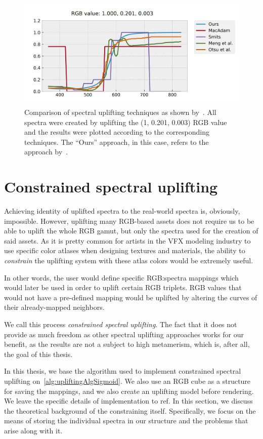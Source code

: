 \begin{figure}[t!]
	\centering
	\includegraphics[width=0.8\linewidth]{img/upsampling_techniques.png}
	\caption{Comparison of spectral uplifting techniques as shown by~\citet{upsamplingJakobHanika}. All spectra were created by uplifting the (1, 0.201, 0.003) RGB value and the results were plotted according to the corresponding techniques. The ``Ours'' approach, in this case, refers to the approach by~\citet{upsamplingJakobHanika}.}
	\label{fig:upliftingTechniques}
\end{figure}

\section{Constrained spectral uplifting}

Achieving identity of uplifted spectra to the real-world spectra is, obviously, impossible. However, uplifting many RGB-based assets does not require us to be able to uplift the whole RGB gamut, but only the spectra used for the creation of said assets. As it is pretty common for artists in the VFX modeling industry to use specific color atlases when designing textures and materials, the ability to \emph{constrain} the uplifting system with these atlas colors would be extremely useful.

In other words, the user would define specific RGB:spectra mappings which would later be used in order to uplift certain RGB triplets. RGB values that would not have a pre-defined mapping would be uplifted by altering the curves of their already-mapped neighbors. 

We call this process \emph{constrained spectral uplifting}. The fact that it does not provide as much freedom as other spectral uplifting approaches works for our benefit, as the results are not a subject to high metamerism, which is, after all, the goal of this thesis.

In this thesis, we base the algorithm used to implement constrained spectral uplifting on~\cref{alg:upliftingAlgSigmoid}. We also use an RGB cube as a structure for saving the mappings, and we also create an uplifting model before rendering. We leave the specific details of implementation to ref. In this section, we discuss the theoretical background of the constraining itself. Specifically, we focus on the means of storing the individual spectra in our structure and the problems that arise along with it.


